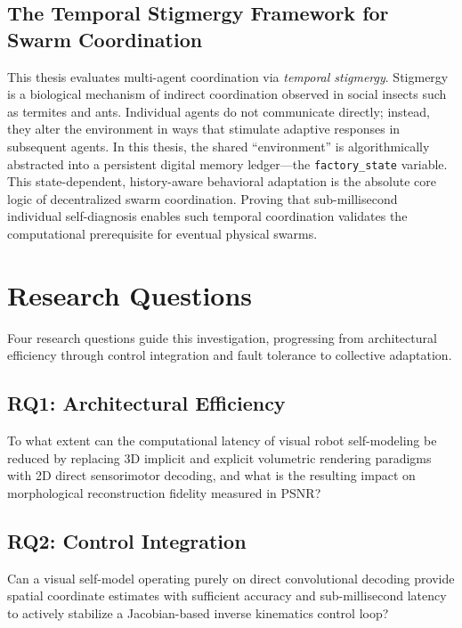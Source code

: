 \documentclass[12pt,a4paper,oneside]{report}
\begin{document}
\subsection{The Temporal Stigmergy Framework for Swarm Coordination}
\label{subsec:temporal_stigmergy_framework_intro}

This thesis evaluates multi-agent coordination via \textit{temporal stigmergy}. Stigmergy is a biological mechanism of indirect coordination observed in social insects such as termites and ants. Individual agents do not communicate directly; instead, they alter the environment in ways that stimulate adaptive responses in subsequent agents. In this thesis, the shared ``environment'' is algorithmically abstracted into a persistent digital memory ledger---the \texttt{factory\_state} variable. This state-dependent, history-aware behavioral adaptation is the absolute core logic of decentralized swarm coordination. Proving that sub-millisecond individual self-diagnosis enables such temporal coordination validates the computational prerequisite for eventual physical swarms.

\section{Research Questions}
\label{sec:research_questions_intro}

Four research questions guide this investigation, progressing from architectural efficiency through control integration and fault tolerance to collective adaptation.

\subsection{RQ1: Architectural Efficiency}
To what extent can the computational latency of visual robot self-modeling be reduced by replacing 3D implicit and explicit volumetric rendering paradigms with 2D direct sensorimotor decoding, and what is the resulting impact on morphological reconstruction fidelity measured in PSNR?

\subsection{RQ2: Control Integration}
Can a visual self-model operating purely on direct convolutional decoding provide spatial coordinate estimates with sufficient accuracy and sub-millisecond latency to actively stabilize a Jacobian-based inverse kinematics control loop?
\end{document}
